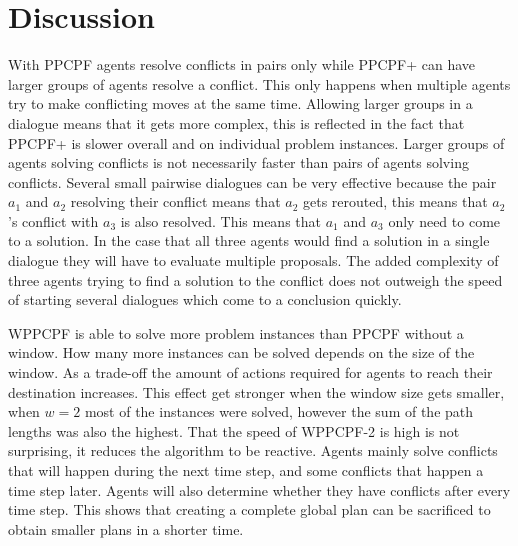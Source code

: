 \section{Discussion}\label{sec:discussion}
With PPCPF agents resolve conflicts in pairs only while PPCPF+ can have larger
groups of agents resolve a conflict. This only happens when multiple agents try
to make conflicting moves at the same time. Allowing larger groups in a
dialogue means that it gets more complex, this is reflected in the fact that
PPCPF+ is slower overall and on individual problem instances. Larger groups of
agents solving conflicts is not necessarily faster than pairs of agents solving
conflicts. Several small pairwise dialogues can be very effective because the
pair $a_1$ and $a_2$ resolving their conflict means that $a_2$ gets rerouted,
this means that $a_2$'s conflict with $a_3$ is also resolved. This means that
$a_1$ and $a_3$ only need to come to a solution. In the case that all three
agents would find a solution in a single dialogue they will have to evaluate
multiple proposals. The added complexity of three agents trying to find a
solution to the conflict does not outweigh the speed of starting several
dialogues which come to a conclusion quickly.

WPPCPF is able to solve more problem instances than PPCPF without a window. How
many more instances can be solved depends on the size of the window. As a
trade-off the amount of actions required for agents to reach their destination
increases. This effect get stronger when the window size gets smaller, when
$w=2$ most of the instances were solved, however the sum of the path lengths
was also the highest. That the speed of WPPCPF-2 is high is not surprising, it
reduces the algorithm to be reactive. Agents mainly solve conflicts that will
happen during the next time step, and some conflicts that happen a time step
later. Agents will also determine whether they have conflicts after every time
step. This shows that creating a complete global plan can be sacrificed to
obtain smaller plans in a shorter time.

